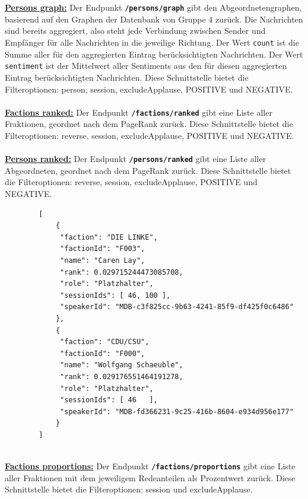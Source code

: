 \\~\\
\textbf{\underline{Persons graph:}}\newline
Der Endpunkt \textbf{\texttt{/persons/graph}} gibt den Abgeordnetengraphen, basierend auf den Graphen der Datenbank von Gruppe 4 zurück. 
Die Nachrichten sind bereits aggregiert, also steht jede Verbindung zwischen Sender und Empfänger für alle Nachrichten in die jeweilige Richtung. Der Wert \texttt{count} ist die Summe aller für den aggregierten Eintrag berücksichtigten Nachrichten. Der Wert \texttt{sentiment} ist der Mittelwert aller Sentiments aus den für diesen aggregierten Eintrag berücksichtigten Nachrichten. Diese Schnittstelle bietet die Filteroptionen: person, session, excludeApplause, POSITIVE und NEGATIVE.	
\\~\\
\textbf{\underline{Factions ranked:}}\newline
Der Endpunkt \textbf{\texttt{/factions/ranked}} gibt eine Liste aller Fraktionen, geordnet nach dem PageRank zurück. Diese Schnittstelle bietet die Filteroptionen: reverse, session, excludeApplause, POSITIVE und NEGATIVE.
\\~\\
\textbf{\underline{Persons ranked:}}\newline
Der Endpunkt \textbf{\texttt{/persons/ranked}} gibt eine Liste aller Abgeordneten, geordnet nach dem PageRank zurück. Diese Schnittstelle bietet die Filteroptionen: reverse, session, excludeApplause, POSITIVE und NEGATIVE.
~\\
\begin{lstlisting}
		[
			{
			 "faction": "DIE LINKE",
			 "factionId": "F003", 
			 "name": "Caren Lay", 
			 "rank": 0.029715244473085708, 
			 "role": "Platzhalter",
			 "sessionIds": [ 46, 100 ],
			 "speakerId": "MDB-c3f825cc-9b63-4241-85f9-df425f0c6486"
			}, 
			{
			 "faction": "CDU/CSU",    
			 "factionId": "F000",
			 "name": "Wolfgang Schaeuble", 
			 "rank": 0.029176551464191278, 
			 "role": "Platzhalter",   
			 "sessionIds": [ 46   ], 
			 "speakerId": "MDB-fd366231-9c25-416b-8604-e934d956e177"
			}
		]
\end{lstlisting}
~\\	
\textbf{\underline{Factions proportions:}}\newline
Der Endpunkt \textbf{\texttt{/factions/proportions}} gibt eine Liste aller Fraktionen mit dem jeweiligem Redeanteilen als Prozentwert zurück. Diese Schnittstelle bietet die Filteroptionen: session und excludeApplause.
